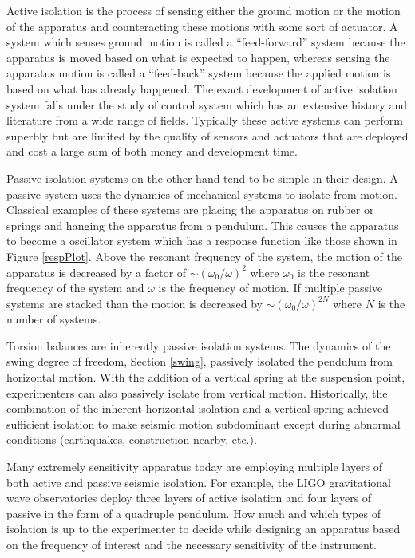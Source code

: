 \documentclass{book}
\begin{document}
Active isolation is the process of sensing either the ground motion or the motion of the apparatus and counteracting these motions with some sort of actuator. A system which senses ground motion is called a ``feed-forward'' system because the apparatus is moved based on what is expected to happen, whereas sensing the apparatus motion is called a ``feed-back'' system because the applied motion is based on what has already happened. The exact development of active isolation system falls under the study of control system which has an extensive history and literature from a wide range of fields. Typically these active systems can perform superbly but are limited by the quality of sensors and actuators that are deployed and cost a large sum of both money and development time. 

Passive isolation systems on the other hand tend to be simple in their design. A passive system uses the dynamics of mechanical systems to isolate from motion. Classical examples of these systems are placing the apparatus on rubber or springs and hanging the apparatus from a pendulum. This causes the apparatus to become a oscillator system which has a response function like those shown in Figure \ref{respPlot}. Above the resonant frequency of the system, the motion of the apparatus is decreased by a factor of $\sim (\omega_0/\omega)^2$ where $\omega_0$ is the resonant frequency of the system and $\omega$ is the frequency of motion. If multiple passive systems are stacked than the motion is decreased by $\sim (\omega_0/\omega)^{2N}$ where $N$ is the number of systems.

Torsion balances are inherently passive isolation systems. The dynamics of the swing degree of freedom, Section \ref{swing}, passively isolated the pendulum from horizontal motion. With the addition of a vertical spring at the suspension point, experimenters can also passively isolate from vertical motion. Historically, the combination of the inherent horizontal isolation and a vertical spring achieved sufficient isolation to make seismic motion subdominant except during abnormal conditions (earthquakes, construction nearby, etc.). 

Many extremely sensitivity apparatus today are employing multiple layers of both active and passive seismic isolation. For example, the LIGO gravitational wave observatories deploy three layers of active isolation and four layers of passive in the form of a quadruple pendulum. How much and which types of isolation is up to the experimenter to decide while designing an apparatus based on the frequency of interest and the necessary sensitivity of the instrument.
\end{document}

